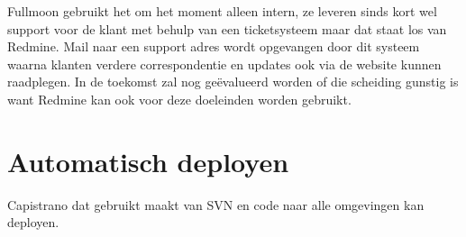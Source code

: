 Fullmoon gebruikt het om het moment alleen intern, ze leveren sinds kort wel support voor de klant met behulp van een ticketsysteem maar dat staat los van Redmine. Mail naar een support adres wordt opgevangen door dit systeem waarna klanten verdere correspondentie en updates ook via de website kunnen raadplegen. In de toekomst zal nog geëvalueerd worden of die scheiding gunstig is want Redmine kan ook voor deze doeleinden worden gebruikt.

\section{Automatisch deployen}

Capistrano dat gebruikt maakt van SVN en code naar alle omgevingen kan deployen.